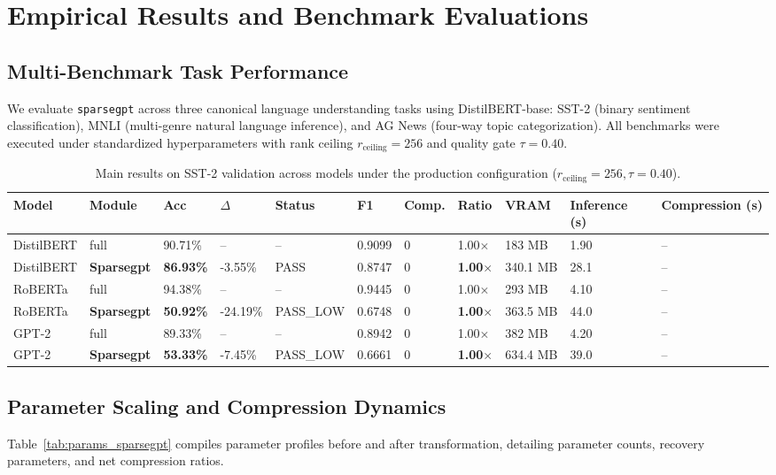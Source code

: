 \section{Empirical Results and Benchmark Evaluations}
\label{sec:results}

\subsection{Multi-Benchmark Task Performance}
We evaluate \texttt{sparsegpt} across three canonical language understanding tasks using DistilBERT-base: SST-2 (binary sentiment classification), MNLI (multi-genre natural language inference), and AG News (four-way topic categorization). All benchmarks were executed under standardized hyperparameters with rank ceiling $r_{\mathrm{ceiling}} = 256$ and quality gate $\tau = 0.40$.

\begin{table}[t]
\centering
\small
\begin{tabular}{lllllllllll}
\toprule
\textbf{Model} & \textbf{Module} & \textbf{Acc} & \textbf{$\Delta$} & \textbf{Status} & \textbf{F1} & \textbf{Comp.} & \textbf{Ratio} & \textbf{VRAM} & \textbf{Inference (s)} & \textbf{Compression (s)} \\
\midrule
DistilBERT & full & 90.71\% & -- & -- & 0.9099 & 0 & 1.00$\times$ & 183 MB & 1.90 & -- \\
DistilBERT & \textbf{Sparsegpt} & \textbf{86.93\%} & -3.55\% & PASS & 0.8747 & 0 & \textbf{1.00$\times$} & 340.1 MB & 28.1 & -- \\
RoBERTa & full & 94.38\% & -- & -- & 0.9445 & 0 & 1.00$\times$ & 293 MB & 4.10 & -- \\
RoBERTa & \textbf{Sparsegpt} & \textbf{50.92\%} & -24.19\% & PASS\_LOW & 0.6748 & 0 & \textbf{1.00$\times$} & 363.5 MB & 44.0 & -- \\
GPT-2 & full & 89.33\% & -- & -- & 0.8942 & 0 & 1.00$\times$ & 382 MB & 4.20 & -- \\
GPT-2 & \textbf{Sparsegpt} & \textbf{53.33\%} & -7.45\% & PASS\_LOW & 0.6661 & 0 & \textbf{1.00$\times$} & 634.4 MB & 39.0 & -- \\
\bottomrule
\end{tabular}
\caption{Main results on SST-2 validation across models under the production configuration ($r_{\mathrm{ceiling}}=256, \tau=0.40$).}
\label{tab:main_sst2}
\end{table}

\subsection{Parameter Scaling and Compression Dynamics}
Table~\ref{tab:params_sparsegpt} compiles parameter profiles before and after transformation, detailing parameter counts, recovery parameters, and net compression ratios.


